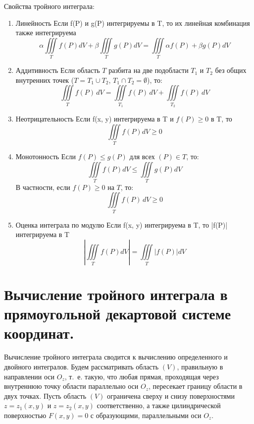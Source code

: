 \documentclass[16pt]{extarticle}
\begin{document}
Свойства тройного интеграла:
\begin{enumerate}
\item Линейность
  Если f(P) и g(P) интегрируемы в T, то их линейная комбинация также интегрируема
  \begin{equation}
    \alpha \iiint\limits_T f(P) dV + \beta \iiint\limits_T g(P) dV = \iiint\limits_T \alpha f(P) + \beta g(P) dV
  \end{equation}
\item Аддитивность
  Если область $T$ разбита на две подобласти $T_1$ и $T_2$ без общих внутренних точек
  ($T = T_1 \cup T_2$, $T_1 \cap T_2 = \emptyset$), то:
  \begin{equation}
    \iiint\limits_T f(P) \, dV =
    \iiint\limits_{T_1} f(P) \, dV +
    \iiint\limits_{T_2} f(P) \, dV
  \end{equation}
\item Неотрицательность
  Если f(x, y) интегрируема в T и $f(P) \geq 0$ в T, то
  \begin{equation}
    \iiint\limits_T f(P) dV \geq 0
  \end{equation}
\item Монотонность
  Если $f(P) \leq g(P)$ для всех $(P) \in T$, то:
  \begin{equation}
    \iiint\limits_T f(P) dV \leq \iiint\limits_T g(P) dV
  \end{equation}
  В частности, если $f(P) \geq 0$ на $T$, то:
  \begin{equation}
    \iiint\limits_T f(P) \, dV \geq 0
  \end{equation}
\item Оценка интеграла по модулю
  Если f(x, y) интегрируема в T, то |f(P)| интегрируема в T
  \begin{equation}
    |\iiint\limits_T f(P)dV|  = \iiint\limits_T |f(P)| dV
  \end{equation}
\end{enumerate}
\section{Вычисление тройного интеграла в прямоугольной декартовой системе координат.}
Вычисление тройного интеграла сводится к вычислению определенного и двойного интегралов.
Будем рассматривать область $(V)$, правильную в направлении оси $O_z$, т.~е. такую, что любая прямая, проходящая через внутреннюю точку области параллельно оси $O_z$, пересекает границу области в двух точках. Пусть область $(V)$ ограничена сверху и снизу поверхностями $z = z_1(x, y)$ и $z = z_2(x, y)$ соответственно, а также цилиндрической поверхностью $F(x, y) = 0$ с образующими, параллельными оси $O_z$.
\end{document}
